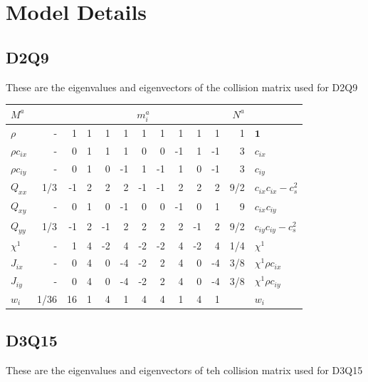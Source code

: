\section{Model Details}

\subsection{D2Q9}

These are the eigenvalues and eigenvectors of the collision
matrix used for D2Q9


\begin{table}
\begin{tabular}{|l|r|rrrrrrrrr|r|l|}
\hline\hline
$M^a$ & & \multicolumn{9}{c|}{$m_i^a$} & $N^a$  &\\
\hline
$\rho$ & - & 1 &  1 &  1 &  1 &  1 &  1 &  1 &   1 &  1 & 1 &$\mathbf{1}$ \\
\hline
$\rho c_{ix}$ & - & 0 &  1 &  1 & 1 & 0 &  0 & -1 &  1 & -1 & 3 & $c_{ix}$ \\
\hline
$\rho c_{iy}$ & - & 0 & 1 &  0 &  -1 &  1 &  -1 & 1 & 0 & -1 & 3  &$c_{iy}$ \\
\hline
$Q_{xx}$ & 1/3 & -1 &  2 &  2 & 2 & -1 & -1 & 2 & 2 & 2 & 9/2 
& $c_{ix} c_{ix} - c_s^2$ \\
\hline
$Q_{xy}$ & - & 0 &  1 & 0 & -1 & 0 & 0 & -1 & 0 & 1 & 9 & $c_{ix} c_{iy}$ \\
\hline
$Q_{yy}$ & 1/3 & -1 &  2 & -1 & 2 & 2 & 2 & 2 & -1 & 2 & 9/2
& $c_{iy} c_{iy} - c_s^2$ \\
\hline\hline
$\chi^1$ & - &  1 & 4 & -2 & 4 & -2 & -2 & 4 & -2 & 4 & 1/4 & $\chi^1$ \\
\hline
$J_{ix}$ & - & 0 &  4 & 0 & -4 & -2 & 2 & 4 & 0 & -4 & 3/8
& $\chi^1 \rho c_{ix}$\\
\hline
$J_{iy}$ & - & 0 & 4 & 0 & -4 & -2 & 2 & 4 & 0 & -4 & 3/8
& $\chi^1 \rho c_{iy}$\\
\hline\hline
$w_i$ & 1/36 & 16 & 1 & 4 & 1 & 4 & 4 & 1 & 4 & 1 & & $w_i$\\
\hline\hline
\end{tabular}
\end{table}

\subsection{D3Q15}

These are the eigenvalues and eigenvectors of teh collision
matrix used for D3Q15


